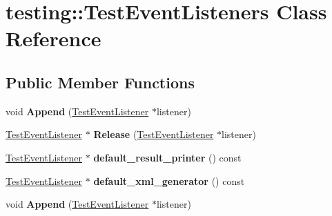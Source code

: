 \hypertarget{classtesting_1_1_test_event_listeners}{}\section{testing\+:\+:Test\+Event\+Listeners Class Reference}
\label{classtesting_1_1_test_event_listeners}
\subsection*{Public Member Functions}
\begin{DoxyCompactItemize}
\item 
\hypertarget{classtesting_1_1_test_event_listeners_a1207dce74d64c1c39ffa6105560536a0}{}void {\bfseries Append} (\hyperlink{classtesting_1_1_test_event_listener}{Test\+Event\+Listener} $\ast$listener)\label{classtesting_1_1_test_event_listeners_a1207dce74d64c1c39ffa6105560536a0}

\item 
\hypertarget{classtesting_1_1_test_event_listeners_a5d4bfb7d8584801d6074bb0ec28f8bda}{}\hyperlink{classtesting_1_1_test_event_listener}{Test\+Event\+Listener} $\ast$ {\bfseries Release} (\hyperlink{classtesting_1_1_test_event_listener}{Test\+Event\+Listener} $\ast$listener)\label{classtesting_1_1_test_event_listeners_a5d4bfb7d8584801d6074bb0ec28f8bda}

\item 
\hypertarget{classtesting_1_1_test_event_listeners_a0a69b6a19e27d53d9ef4683c05e9f75a}{}\hyperlink{classtesting_1_1_test_event_listener}{Test\+Event\+Listener} $\ast$ {\bfseries default\+\_\+result\+\_\+printer} () const \label{classtesting_1_1_test_event_listeners_a0a69b6a19e27d53d9ef4683c05e9f75a}

\item 
\hypertarget{classtesting_1_1_test_event_listeners_a9867c9af50e8d2934a2475286c7cebc5}{}\hyperlink{classtesting_1_1_test_event_listener}{Test\+Event\+Listener} $\ast$ {\bfseries default\+\_\+xml\+\_\+generator} () const \label{classtesting_1_1_test_event_listeners_a9867c9af50e8d2934a2475286c7cebc5}

\item 
\hypertarget{classtesting_1_1_test_event_listeners_a1207dce74d64c1c39ffa6105560536a0}{}void {\bfseries Append} (\hyperlink{classtesting_1_1_test_event_listener}{Test\+Event\+Listener} $\ast$listener)\label{classtesting_1_1_test_event_listeners_a1207dce74d64c1c39ffa6105560536a0}


\end{DoxyCompactItemize}
